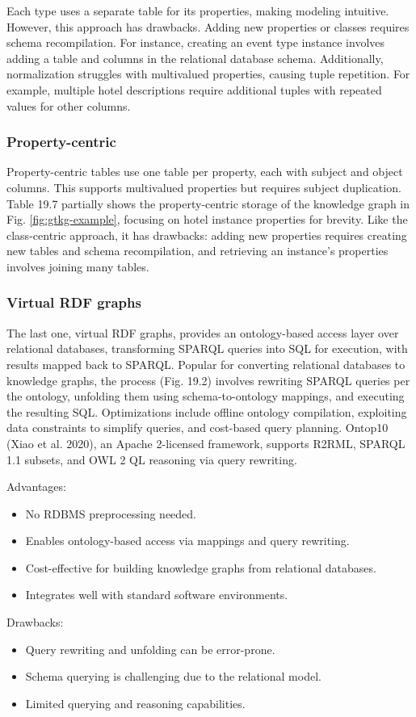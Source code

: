 \documentclass[12pt]{article}
\begin{document}
Each type uses a separate table for its properties, making modeling intuitive. However, this approach has drawbacks. Adding new properties or classes requires schema recompilation. For instance, creating an event type instance involves adding a table and columns in the relational database schema. Additionally, normalization struggles with multivalued properties, causing tuple repetition. For example, multiple hotel descriptions require additional tuples with repeated values for other columns.
\subsubsection{Property-centric}
Property-centric tables use one table per property, each with subject and object columns. This supports multivalued properties but requires subject duplication. Table 19.7 partially shows the property-centric storage of the knowledge graph in Fig. \ref{fig:gtkg-example}, focusing on hotel instance properties for brevity. Like the class-centric approach, it has drawbacks: adding new properties requires creating new tables and schema recompilation, and retrieving an instance’s properties involves joining many tables.
\subsubsection{Virtual RDF graphs}
The last one, virtual RDF graphs, provides an ontology-based access layer over relational databases, transforming SPARQL queries into SQL for execution, with results mapped back to SPARQL. Popular for converting relational databases to knowledge graphs, the process (Fig. 19.2) involves rewriting SPARQL queries per the ontology, unfolding them using schema-to-ontology mappings, and executing the resulting SQL. Optimizations include offline ontology compilation, exploiting data constraints to simplify queries, and cost-based query planning. Ontop10 (Xiao et al. 2020), an Apache 2-licensed framework, supports R2RML, SPARQL 1.1 subsets, and OWL 2 QL reasoning via query rewriting.
\begin{multicols}{2}
    Advantages:
    \begin{itemize}
        \item No RDBMS preprocessing needed.
        \item Enables ontology-based access via mappings and query rewriting.
        \item Cost-effective for building knowledge graphs from relational databases.
        \item Integrates well with standard software environments.
    \end{itemize}
    \columnbreak
    Drawbacks:
    \begin{itemize}
        \item Query rewriting and unfolding can be error-prone.
        \item Schema querying is challenging due to the relational model.
        \item Limited querying and reasoning capabilities.
    \end{itemize}
\end{multicols}
\end{document}
